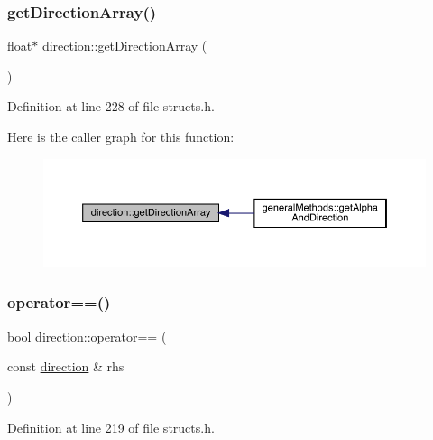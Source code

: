 \subsubsection{\texorpdfstring{get\+Direction\+Array()}{getDirectionArray()}}
{\footnotesize\ttfamily float$\ast$ direction\+::get\+Direction\+Array (\begin{DoxyParamCaption}{ }\end{DoxyParamCaption})\hspace{0.3cm}{\ttfamily [inline]}}



Definition at line 228 of file structs.\+h.

Here is the caller graph for this function\+:
\nopagebreak
\begin{figure}[H]
\begin{center}
\leavevmode
\includegraphics[width=350pt]{structdirection_af1cd0f36bb6f2ed44c2adc4599288b28_icgraph}
\end{center}
\end{figure}
\mbox{\label{structdirection_a07af488d6fa8d5b140fedf087f6d62d9}} 
\subsubsection{\texorpdfstring{operator==()}{operator==()}}
{\footnotesize\ttfamily bool direction\+::operator== (\begin{DoxyParamCaption}\item[{const \mbox{\hyperlink{structdirection}{direction}} \&}]{rhs }\end{DoxyParamCaption})\hspace{0.3cm}{\ttfamily [inline]}}



Definition at line 219 of file structs.\+h.

